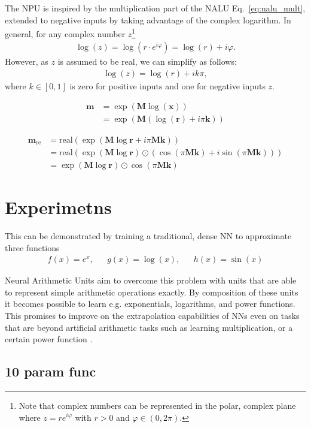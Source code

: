 \documentclass[9pt]{article}
\newcommand{\real}{\text{real}}
\begin{document}
The NPU is inspired by the multiplication part of the NALU
Eq.~\ref{eq:nalu_mult}, extended to negative inputs by taking advantage of the
complex logarithm. In general, for any complex number $z$\footnote{Note that
complex numbers can be represented in the polar, complex plane where
$z=re^{i\varphi}$ with $r>0$ and $\varphi \in (0,2\pi)$.}
\begin{align}
  \log(z) = \log\left(r\cdot e^{i\varphi}\right)
     = \log(r) + i\varphi.
\end{align}
However, as $z$ is assumed to be real, we can simplify as follows:
\begin{align}
  \log(z) = \log(r) + ik\pi,
\end{align}
where $k \in [0,1]$ is zero for positive inputs and one for negative inputs $z$.

\begin{align}
  \bm m &= \exp(\bm M \log(\bm x)) \\
    &= \exp(\bm M ( \log(\bm r) + i\pi\bm k ))
\end{align}

\begin{align}
  \bm m_{\text{re}} &= \real(\exp(\bm M \log \bm r + i\pi\bm M\bm k)) \\
    &= \real(\exp(\bm M \log \bm r) \odot (\cos(\pi \bm M \bm k) + i \sin(\pi \bm M \bm k))) \\
    &= \exp(\bm M \log \bm r) \odot \cos(\pi \bm M \bm k)
\end{align}

\section{Experimetns}%
\label{sec:experimetns}
This can be demonstrated by training a traditional, dense NN to approximate
three functions
\begin{align}
  \label{eq:approx_tasks}
  f(x) = e^x, && g(x) = \log(x), && h(x) = \sin(x)
\end{align}

Neural Arithmetic Units aim to overcome this problem with units that are able
to represent simple arithmetic operations exactly. By composition of these
units it becomes possible to learn e.g. exponentials, logarithms, and power
functions. This promises to improve on the extrapolation capabilities of NNs
even on tasks that are beyond artificial arithmetic tasks such as learning
multiplication, or a certain power function .


\subsection{10 param func}%
\label{sub:10_param_func}
\end{document}
